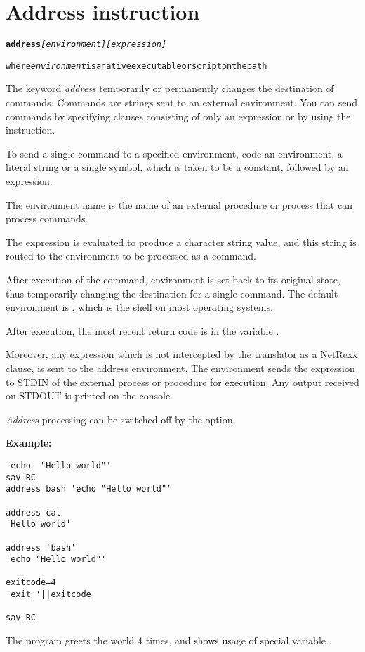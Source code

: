 \chapter{Address instruction}\label{refparse}
\begin{shaded}
\begin{alltt}
\textbf{address} \emph{[environment]} \emph{[expression]}

where \emph{environment} is a native executable or script on the path

\end{alltt}
\end{shaded}
The keyword \emph{address} temporarily or permanently changes the destination of commands. Commands are strings sent to an external environment. You can send commands by specifying clauses consisting of only an expression or by using the  instruction.

To send a single command to a specified environment, code an
environment, a literal string or a single symbol, which is taken to be
a constant, followed by an expression.

The environment name is the
name of an external procedure or process that can process
commands.

The expression is evaluated to produce a character string
value, and this string is routed to the environment to be processed as
a command.

After execution of the command, environment is set back to
its original state, thus temporarily changing the destination for a
single command. The default environment is , which is the shell
on most operating systems.

After execution, the most recent return code is in the variable .

Moreover, any expression which is not intercepted by the translator as a NetRexx clause, is sent to the address environment.
The environment sends the expression to STDIN of the external process or procedure for execution.
Any output received on STDOUT is printed on the console.

\emph{Address} processing can be switched off by the  option.

\textbf{Example:}
\begin{lstlisting}
'echo  "Hello world"'
say RC
address bash 'echo "Hello world"'

address cat
'Hello world'

address 'bash'
'echo "Hello world"'

exitcode=4
'exit '||exitcode
 
say RC
\end{lstlisting}
The program greets the world 4 times, and shows usage of special variable .

